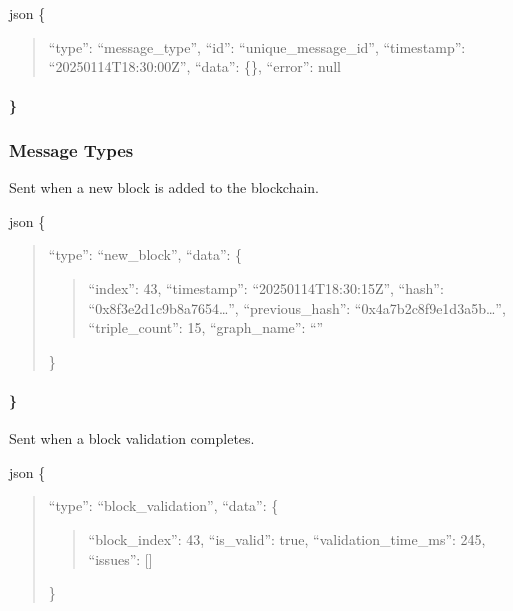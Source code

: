 \documentclass[letterpaper,10pt,english]{sphinxmanual}
\begin{document}
\sphinxAtStartPar
{\color{red}\bfseries{}\textasciigrave{}\textasciigrave{}}{\color{red}\bfseries{}\textasciigrave{}}json
\{
\begin{quote}

\sphinxAtStartPar
“type”: “message\_type”,
“id”: “unique\_message\_id”,
“timestamp”: “2025\sphinxhyphen{}01\sphinxhyphen{}14T18:30:00Z”,
“data”: \{\},
“error”: null
\end{quote}


\paragraph{\}}
\label{\detokenize{api/websocket-api:id10}}

\subsubsection{Message Types}
\label{\detokenize{api/websocket-api:message-types}}
\sphinxAtStartPar
{}
Sent when a new block is added to the blockchain.

\sphinxAtStartPar
{\color{red}\bfseries{}\textasciigrave{}\textasciigrave{}}{\color{red}\bfseries{}\textasciigrave{}}json
\{
\begin{quote}

\sphinxAtStartPar
“type”: “new\_block”,
“data”: \{
\begin{quote}

\sphinxAtStartPar
“index”: 43,
“timestamp”: “2025\sphinxhyphen{}01\sphinxhyphen{}14T18:30:15Z”,
“hash”: “0x8f3e2d1c9b8a7654…”,
“previous\_hash”: “0x4a7b2c8f9e1d3a5b…”,
“triple\_count”: 15,
“graph\_name”: “”
\end{quote}

\sphinxAtStartPar
\}
\end{quote}


\paragraph{\}}
\label{\detokenize{api/websocket-api:id15}}
\sphinxAtStartPar
{}
Sent when a block validation completes.

\sphinxAtStartPar
{\color{red}\bfseries{}\textasciigrave{}\textasciigrave{}}{\color{red}\bfseries{}\textasciigrave{}}json
\{
\begin{quote}

\sphinxAtStartPar
“type”: “block\_validation”,
“data”: \{
\begin{quote}

\sphinxAtStartPar
“block\_index”: 43,
“is\_valid”: true,
“validation\_time\_ms”: 245,
“issues”: {[}{]}
\end{quote}

\sphinxAtStartPar
\}
\end{quote}
\end{document}
